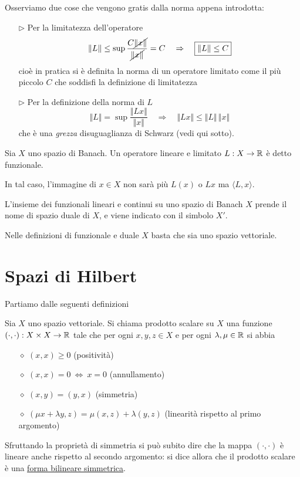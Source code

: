 Osserviamo due cose che vengono gratis dalla norma appena introdotta:
\begin{enumerate}
    \item [$\triangleright$] Per la limitatezza dell'operatore
    \begin{equation*}
    \Vert L\Vert\leq \sup \frac{C\cancel{\Vert x \Vert}}{\cancel{\Vert x\Vert}}= C \quad \Rightarrow \quad \boxed{\Vert L\Vert\leq C}
    \end{equation*}
    cioè in pratica si è definita la norma di un operatore limitato come il più piccolo $C$ che soddisfi la definizione di limitatezza
    \item [$\triangleright$] Per la definizione della norma di $L$
    \begin{equation*}
    \Vert L \Vert= \sup \frac{\Vert Lx \Vert}{\Vert x\Vert} \quad \Rightarrow \quad \boxed{\Vert Lx \Vert \leq \Vert L \Vert\,\Vert x\Vert}
    \end{equation*}
    che è una \textit{grezza} disuguaglianza di Schwarz (vedi qui sotto).
\end{enumerate}

\begin{defn}[Funzionale]
Sia $X$ uno spazio di Banach. Un operatore lineare e limitato $L:X\to\mathbb{R}$ è detto funzionale.
\end{defn}

In tal caso, l'immagine di $x\in X$ non sarà più $L(x)$ o $Lx$ ma $\langle L,x \rangle$.

\begin{defn}
L'insieme dei funzionali lineari e continui su uno spazio di Banach $X$ prende il nome di spazio duale di $X$, e viene indicato con il simbolo $X'$.
\end{defn}
Nelle definizioni di funzionale e duale $X$ basta che sia uno spazio vettoriale.

\section{Spazi di Hilbert}

Partiamo dalle seguenti definizioni

\begin{defn}
Sia $X$ uno spazio vettoriale. Si chiama prodotto scalare su $X$ una funzione $(\cdot,\cdot):X\times X\to\mathbb{R}$ tale che per ogni $x,y,z\in X$ e per ogni $\lambda,\mu\in\mathbb{R}$ si abbia
\begin{enumerate}
    \item [$\diamond$] $(x,x)\geq 0$ (positività)
    \item [$\diamond$] $(x,x)=0\ \Leftrightarrow\ x=0$ (annullamento)
    \item [$\diamond$] $(x,y)=(y,x)$ (simmetria)
    \item [$\diamond$] $(\mu x+\lambda y,z)=\mu(x,z)+\lambda(y,z)$ (linearità rispetto al primo argomento)
\end{enumerate}
\end{defn}
Sfruttando la proprietà di simmetria si può subito dire che la mappa $(\cdot,\cdot)$ è lineare anche rispetto al secondo argomento: si dice allora che il prodotto scalare è una \underline{forma bilineare simmetrica}.

